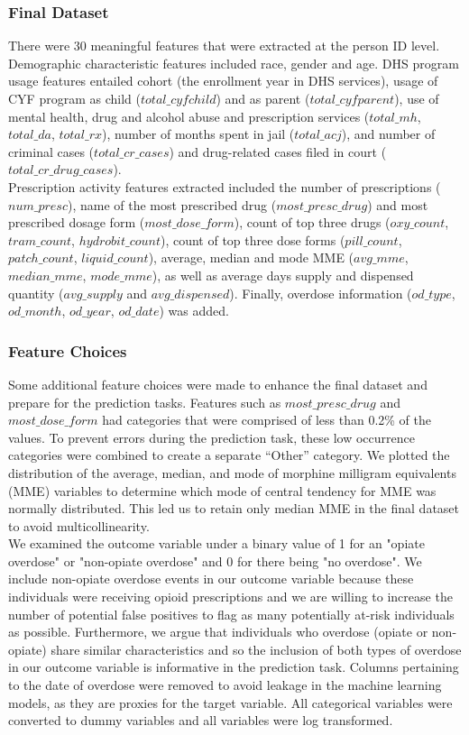 \documentclass[twoside,10.5pt]{article}
\begin{document}
\subsubsection{Final Dataset}
There were 30 meaningful features that were extracted at the person ID level. Demographic characteristic features included race, gender and age. DHS program usage features entailed cohort (the enrollment year in DHS services), usage of CYF program as child ($total\_cyfchild$) and as parent ($total\_cyfparent$), use of mental health, drug and alcohol abuse and prescription services ($total\_mh$, $total\_da$, $total\_rx$), number of months spent in jail ($total\_acj$), and number of criminal cases ($total\_cr\_cases$) and drug-related cases filed in court ($total\_cr\_drug\_cases$). \\

Prescription activity features extracted included the number of prescriptions ($num\_presc$), name of the most prescribed drug ($most\_presc\_drug$) and most prescribed dosage form ($most\_dose\_form$), count of top three drugs ($oxy\_count$, $tram\_count$, $hydrobit\_count$), count of top three dose forms ($pill\_count$, $patch\_count$, $liquid\_count$), average, median and mode MME ($avg\_mme$, $median\_mme$, $mode\_mme$), as well as average days supply and dispensed quantity ($avg\_supply$ and $avg\_dispensed$). Finally, overdose information ($od\_type$, $od\_month$, $od\_year$, $od\_date$) was added. 

\subsubsection{Feature Choices}
Some additional feature choices were made to enhance the final dataset and prepare for the prediction tasks. Features such as $most\_presc\_drug$ and $most\_dose\_form$ had categories that were comprised of less than 0.2\% of the values. To prevent errors during the prediction task, these low occurrence categories were combined to create a separate “Other” category. We plotted the distribution of the average, median, and mode of morphine milligram equivalents (MME) variables to determine which mode of central tendency for MME was normally distributed. This led us to retain only median MME in the final dataset to avoid multicollinearity.\\

We examined the outcome variable under a binary value of 1 for an "opiate overdose" or "non-opiate overdose" and 0 for there being "no overdose". We include non-opiate overdose events in our outcome variable because these individuals were receiving opioid prescriptions and we are willing to increase the number of potential false positives to flag as many potentially at-risk individuals as possible. Furthermore, we argue that individuals who overdose (opiate or non-opiate) share similar characteristics and so the inclusion of both types of overdose in our outcome variable is informative in the prediction task. Columns pertaining to the date of overdose were removed to avoid leakage in the machine learning models, as they are proxies for the target variable. All categorical variables were converted to dummy variables and all variables were log transformed.
\end{document}

